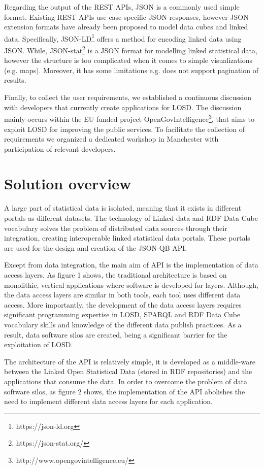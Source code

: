 \documentclass{llncs}
\begin{document}
Regarding the output of the REST APIs, JSON is a commonly used simple format. Existing REST APIs use 
case-specific JSON responses, however JSON extension formats have already been proposed to model data cubes and linked data. Specifically, JSON-LD\footnote{https://json-ld.org} offers a method for encoding linked data using JSON. While, JSON-stat\footnote{https://json-stat.org/} is a JSON format for modelling linked statistical data, however the structure is too complicated when it comes to simple visualizations (e.g. maps). Moreover, it has some limitations e.g. does not support pagination of results. 

Finally, to collect the user requirements, we established a continuous discussion with developers that currently create applications for LOSD. The discussion mainly occurs within the EU funded project OpenGovIntelligence\footnote{http://www.opengovintelligence.eu/}, that aims to exploit LOSD for improving the public services. To facilitate the collection of requirements we organized a dedicated workshop in Manchester with participation of relevant developers. 

\section{Solution overview}\label{sec:overview}

A large part of statistical data is isolated, meaning that it exists in different portals as different datasets. The technology of Linked data and RDF Data Cube vocabulary solves the problem of distributed data sources through their integration, creating interoperable linked statistical data portals. These portals are used for the design and creation of the JSON-QB API. 
 
Except from data integration, the main aim of API is the implementation of data access layers. As figure 1 shows, the traditional architecture is based on monolithic, vertical applications where software is developed for layers. Although, the data access layers are similar in both tools, each tool uses different data access. More importantly, the development of the data access layers requires significant programming expertise in LOSD, SPARQL and RDF Data Cube vocabulary skills and knowledge of the different data publish practices. As a result, data software silos are created, being a significant barrier for the exploitation of LOSD. 

The architecture of the API is relatively simple, it is developed as a middle-ware between the Linked Open Statistical Data (stored in RDF repositories) and the applications that consume the data. In order to overcome the problem of data software silos, as figure 2 shows, the implementation of the API abolishes the need to implement different data access layers for each application.
\end{document}
